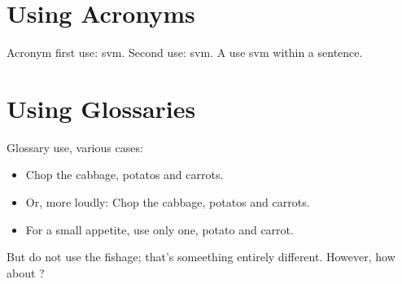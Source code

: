 \documentclass{article}
\begin{document}
\section{Using Acronyms}
Acronym first use: \gls{svm}. Second use: \gls{svm}. A use \gls{svm} within a sentence.

\section{Using Glossaries}
Glossary use, various cases:
\begin{itemize}
\item Chop the \gls{cabbage}, \glspl{potato} and \glspl{carrot}.
\item Or, more loudly: Chop the \Gls{cabbage}, \Glspl{potato} and \Glspl{carrot}.
\item For a small appetite, use only one, \gls{potato} and \gls{carrot}.
\end{itemize}
But do not use the \gls{fishage}; that's someething entirely different.
However, how about ?

\printnoidxglossaries
\end{document}
